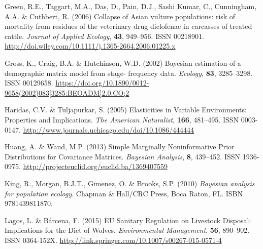 \documentclass[12pt]{article}
\begin{document}
\begin{thebibliography}{87}
	Green, R.E., Taggart, M.A., Das, D., Pain, D.J., {Sashi Kumar}, C., Cunningham,
	A.A. \& Cuthbert, R. (2006) {Collapse of Asian vulture populations: risk of
		mortality from residues of the veterinary drug diclofenac in carcasses of
		treated cattle}.
	\newblock \emph{Journal of Applied Ecology}, \textbf{43}, 949--956.
	\newblock ISSN 00218901.
	\newline\urlprefix\url{http://doi.wiley.com/10.1111/j.1365-2664.2006.01225.x}
	
	Gross, K., Craig, B.A. \& Hutchinson, W.D. (2002) {Bayesian estimation of a
		demographic matrix model from stage- frequency data}.
	\newblock \emph{Ecology}, \textbf{83}, 3285--3298.
	\newblock ISSN 00129658.
	\newline\urlprefix\url{https://doi.org/10.1890/0012-9658(2002)083[3285:BEOADM]2.0.CO;2}
	
	Haridas, C.V. \& Tuljapurkar, S. (2005) {Elasticities in Variable Environments:
		Properties and Implications}.
	\newblock \emph{The American Naturalist}, \textbf{166}, 481--495.
	\newblock ISSN 0003-0147.
	\newline\urlprefix\url{http://www.journals.uchicago.edu/doi/10.1086/444444}
	
	Huang, A. \& Wand, M.P. (2013) {Simple Marginally Noninformative Prior
		Distributions for Covariance Matrices}.
	\newblock \emph{Bayesian Analysis}, \textbf{8}, 439--452.
	\newblock ISSN 1936-0975.
	\newline\urlprefix\url{http://projecteuclid.org/euclid.ba/1369407559}
	
	King, R., Morgan, B.J.T., Gimenez, O. \& Brooks, S.P. (2010) \emph{{Bayesian
			analysis for population ecology}}.
	\newblock Chapman {\&} Hall/CRC Press, Boca Raton, FL.
	\newblock ISBN 9781439811870.
	
	Lagos, L. \& B{\'{a}}rcena, F. (2015) {EU Sanitary Regulation on Livestock
		Disposal: Implications for the Diet of Wolves}.
	\newblock \emph{Environmental Management}, \textbf{56}, 890--902.
	\newblock ISSN 0364-152X.
	\newline\urlprefix\url{http://link.springer.com/10.1007/s00267-015-0571-4}
	

\end{thebibliography}
\end{document}
